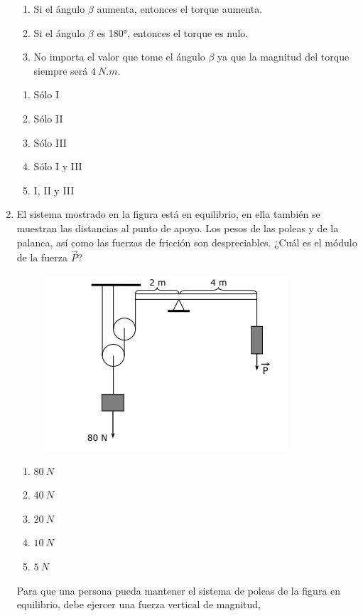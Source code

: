 \documentclass[letterpaper]{article}
\newenvironment{enumalf}
{\begin{enumerate}[label=\Alph*)]}
{\end{enumerate}}
\newenvironment{enumroman}
{\begin{enumerate}[label=\Roman*)]}
{\end{enumerate}}
\begin{document}
\begin{enumerate}
\begin{enumroman}
\item Si el ángulo $\beta$ aumenta, entonces el torque aumenta.
\item Si el ángulo $\beta$ es \ang{180}, entonces el torque es nulo.
\item No importa el valor que tome el ángulo $\beta$ ya que la magnitud del torque siempre será $4\ \si{N.m}$.
\end{enumroman}

\begin{enumalf}
\item Sólo I
\item Sólo II
\item Sólo III
\item Sólo I y III
\item I, II y III
\end{enumalf}

\item El sistema mostrado en la figura está en equilibrio, en ella también se muestran las distancias al punto de apoyo. Los pesos de las poleas y de la palanca, así como las fuerzas de fricción son despreciables. ¿Cuál es el módulo de la fuerza $\vec{P}$?

\begin{figure}[h]
\centering
\includegraphics[scale=0.5]{poleas.png}
\end{figure}

\begin{enumalf}
\item $80\ \si{N}$
\item $40\ \si{N}$
\item $20\ \si{N}$
\item $10\ \si{N}$
\item $5\ \si{N}$
\end{enumalf}

Para que una persona pueda mantener el sistema de poleas de la figura en equilibrio, debe ejercer una fuerza vertical de magnitud,


\end{enumerate}
\end{document}
